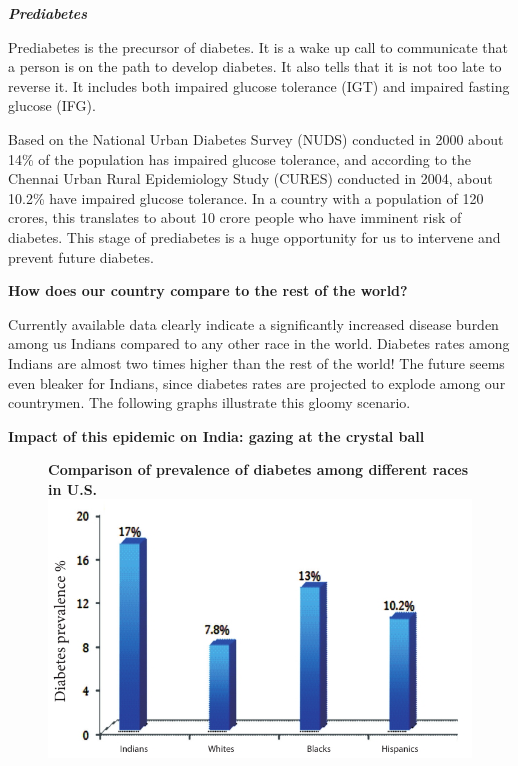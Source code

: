 \vskip 8pt
\noindent\textbf{\textit{Prediabetes}}

Prediabetes is the precursor of diabetes. It is a wake up call to communicate that a person is on the path to develop diabetes. It also tells that it is not too late to reverse it. It includes both impaired glucose tolerance (IGT) and impaired fasting glucose (IFG).

Based on the National Urban Diabetes Survey (NUDS) conducted in 2000 about 14\% of the population has impaired glucose tolerance, and according to the Chennai Urban Rural Epidemiology Study (CURES) conducted in 2004, about 10.2\% have impaired glucose tolerance. In a country with a population of 120 crores, this translates to about 10 crore people who have imminent risk of diabetes. This stage of prediabetes is a huge opportunity for us to intervene and prevent future diabetes.

\noindent\textbf{How does our country compare to the rest of the world?}

Currently available data clearly indicate a significantly increased disease burden among us Indians compared to any other race in the world. Diabetes rates among Indians are almost two times higher than the rest of the world! The future seems even bleaker for Indians, since diabetes rates are projected to explode among our countrymen. The following graphs illustrate this gloomy scenario.

\noindent\textbf{Impact of this epidemic on India: gazing at the crystal ball}

\begin{figure}[h]
\centering
{\small\textbf{Comparison of prevalence of diabetes among different races in U.S.}}\\
\includegraphics[scale=2.1]{images/031.jpg}
\end{figure}

